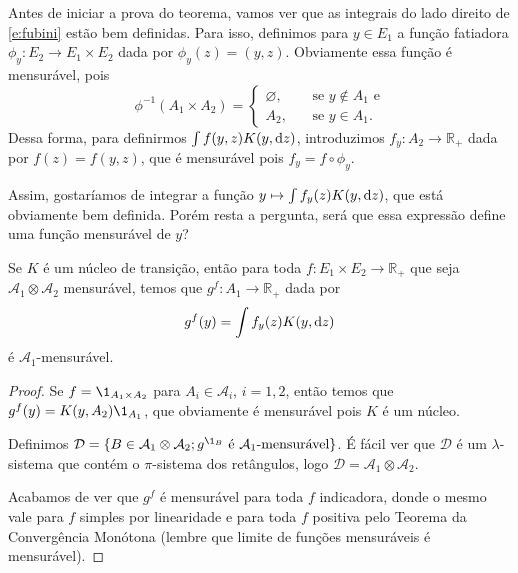 Antes de iniciar a prova do teorema, vamos ver que as integrais do lado direito de \eqref{e:fubini} estão bem definidas.
Para isso, definimos para $y \in E_1$ a função fatiadora $\phi_y: E_2 \to E_1 \times E_2$ dada por $\phi_y(z) = (y, z)$.
Obviamente essa função é mensurável, pois
\begin{equation}
  \phi^{-1}(A_1 \times A_2) =
  \begin{cases}
    \varnothing, \quad & \text{ se $y \not \in A_1$ e}\\
    A_2, & \text{ se $y \in A_1$}.
  \end{cases}
\end{equation}
Dessa forma, para definirmos $\int f(y,z) K(y, \mathop{}\!\mathrm{d} z)$, introduzimos $f_y: A_2 \to \mathbb{R}_+$ dada por $f(z) = f(y,z)$, que é mensurável pois $f_y = f \circ \phi_y$.

Assim, gostaríamos de integrar a função $y \mapsto \int f_y(z) K(y, \mathop{}\!\mathrm{d} z)$, que está obviamente bem definida.
Porém resta a pergunta, será que essa expressão define uma função mensurável de $y$?

\begin{lemma}
  Se $K$ é um núcleo de transição, então para toda $f: E_1 \times E_2 \to \mathbb{R}_+$ que seja $\mathcal{A}_1 \otimes \mathcal{A}_2$ mensurável, temos que $g^f:A_1 \to \mathbb{R}_+$ dada por
  \begin{equation}
    g^f(y) = \int f_y(z) K(y, \mathop{}\!\mathrm{d} z)
  \end{equation}
  é $\mathcal{A}_1$-mensurável.
\end{lemma}

\begin{proof}
  Se $f = \1_{A_1 \times A_2}$ para $A_i \in \mathcal{A}_i$, $i = 1,2$, então temos que $g^f(y) = K(y, A_2) \1_{A_1}$, que obviamente é mensurável pois $K$ é um núcleo.

  Definimos $\mathcal{D} = \{B \in \mathcal{A}_1 \otimes \mathcal{A}_2; g^{\1_B} \text{ é $\mathcal{A}_1$-mensurável}\}$.
  É fácil ver que $\mathcal{D}$ é um $\lambda$-sistema que contém o $\pi$-sistema dos retângulos, logo $\mathcal{D} = \mathcal{A}_1 \otimes \mathcal{A}_2$.

  Acabamos de ver que $g^f$ é mensurável para toda $f$ indicadora, donde o mesmo vale para $f$ simples por linearidade e para toda $f$ positiva pelo Teorema da Convergência Monótona (lembre que limite de funções mensuráveis é mensurável).
\end{proof}

